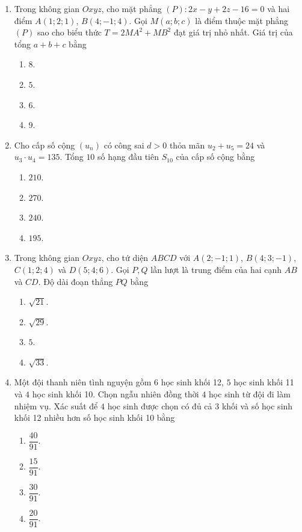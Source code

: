 \documentclass[12pt,a4paper]{article}
\begin{document}
\begin{enumerate}[label=\textbf{Câu \arabic*:}, leftmargin=*]
\item Trong không gian $Oxyz$, cho mặt phẳng $(P): 2x - y + 2z - 16 = 0$ và hai điểm $A(1; 2; 1)$, $B(4; -1; 4)$. Gọi $M(a; b; c)$ là điểm thuộc mặt phẳng $(P)$ sao cho biểu thức $T = 2MA^2 + MB^2$ đạt giá trị nhỏ nhất. Giá trị của tổng $a + b + c$ bằng
\begin{enumerate}[label=\Alph*.]
    \item $8$.
    \item $5$.
    \item $6$.
    \item $9$.
\end{enumerate}

\item Cho cấp số cộng $(u_n)$ có công sai $d > 0$ thỏa mãn $u_2 + u_5 = 24$ và $u_3 \cdot u_4 = 135$. Tổng $10$ số hạng đầu tiên $S_{10}$ của cấp số cộng bằng
\begin{enumerate}[label=\Alph*.]
    \item $210$.
    \item $270$.
    \item $240$.
    \item $195$.
\end{enumerate}

\item Trong không gian $Oxyz$, cho tứ diện $ABCD$ với $A(2; -1; 1)$, $B(4; 3; -1)$, $C(1; 2; 4)$ và $D(5; 4; 6)$. Gọi $P, Q$ lần lượt là trung điểm của hai cạnh $AB$ và $CD$. Độ dài đoạn thẳng $PQ$ bằng
\begin{enumerate}[label=\Alph*.]
    \item $\sqrt{21}$.
    \item $\sqrt{29}$.
    \item $5$.
    \item $\sqrt{33}$.
\end{enumerate}

\item Một đội thanh niên tình nguyện gồm $6$ học sinh khối 12, $5$ học sinh khối 11 và $4$ học sinh khối 10. Chọn ngẫu nhiên đồng thời $4$ học sinh từ đội đi làm nhiệm vụ. Xác suất để $4$ học sinh được chọn có đủ cả $3$ khối và số học sinh khối 12 nhiều hơn số học sinh khối 10 bằng
\begin{enumerate}[label=\Alph*.]
    \item $\dfrac{40}{91}$.
    \item $\dfrac{15}{91}$.
    \item $\dfrac{30}{91}$.
    \item $\dfrac{20}{91}$.
\end{enumerate}

\end{enumerate}
\end{document}
